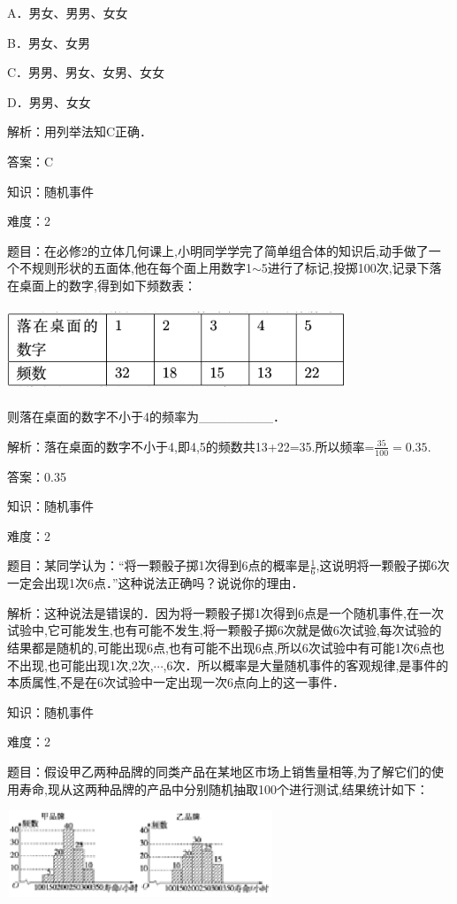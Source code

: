 \documentclass{article} %
\begin{document}
A．男女、男男、女女

B．男女、女男

C．男男、男女、女男、女女

D．男男、女女

解析：用列举法知C正确．

答案：C

知识：随机事件

难度：2

题目：在必修2的立体几何课上,小明同学学完了简单组合体的知识后,动手做了一个不规则形状的五面体,他在每个面上用数字1$\sim$5进行了标记,投掷100次,记录下落在桌面上的数字,得到如下频数表：

\includegraphics*[width=4in, height=1in, keepaspectratio=false]{image123}

则落在桌面的数字不小于4的频率为\_\_\_\_\_\_\_\_．

解析：落在桌面的数字不小于4,即4,5的频数共13+22=35.所以频率=$\frac{35}{100}=0.35$.

答案：0.35

知识：随机事件

难度：2

题目：某同学认为：``将一颗骰子掷1次得到6点的概率是$\frac{1}{6}$,这说明将一颗骰子掷6次一定会出现1次6点．''这种说法正确吗？说说你的理由．

解析：这种说法是错误的．因为将一颗骰子掷1次得到6点是一个随机事件,在一次试验中,它可能发生,也有可能不发生,将一颗骰子掷6次就是做6次试验,每次试验的结果都是随机的,可能出现6点,也有可能不出现6点,所以6次试验中有可能1次6点也不出现,也可能出现1次,2次,$\cdots$,6次．所以概率是大量随机事件的客观规律,是事件的本质属性,不是在6次试验中一定出现一次6点向上的这一事件．

知识：随机事件

难度：2

题目：假设甲乙两种品牌的同类产品在某地区市场上销售量相等,为了解它们的使用寿命,现从这两种品牌的产品中分别随机抽取100个进行测试,结果统计如下：

\includegraphics*[width=3.15in, height=1.02in, keepaspectratio=false]{image99}
\end{document}
